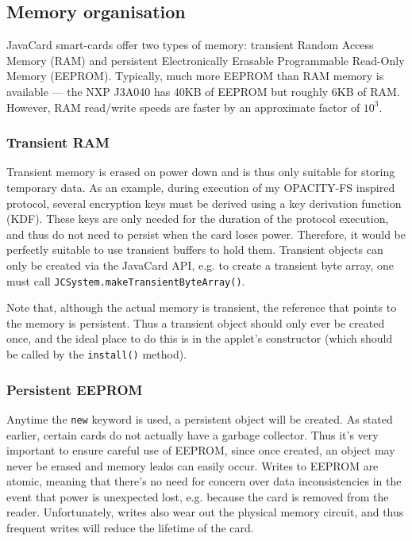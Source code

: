 \documentclass[12pt,a4paper,twoside,openright]{report}
\begin{document}
\subsection{Memory organisation} \label{javacardmemory}

JavaCard smart-cards offer two types of memory: transient Random Access Memory (RAM) and persistent Electronically Erasable Programmable Read-Only Memory (EEPROM). Typically, much more EEPROM than RAM memory is available --- the NXP J3A040 has 40KB of EEPROM but roughly 6KB of RAM. However, RAM read/write speeds are faster by an approximate factor of $10^3$.

\subsubsection{Transient RAM}

Transient memory is erased on power down and is thus only suitable for storing temporary data. As an example, during execution of my OPACITY-FS inspired protocol, several encryption keys must be derived using a key derivation function (KDF). These keys are only needed for the duration of the protocol execution, and thus do not need to persist when the card loses power. Therefore, it would be perfectly suitable to use transient buffers to hold them. Transient objects can only be created via the JavaCard API, e.g. to create a transient byte array, one must call \texttt{JCSystem.makeTransientByteArray()}.

Note that, although the actual memory is transient, the reference that points to the memory is persistent. Thus a transient object should only ever be created once, and the ideal place to do this is in the applet's constructor (which should be called by the \texttt{install()} method).

\subsubsection{Persistent EEPROM}

Anytime the \texttt{new} keyword is used, a persistent object will be created. As stated earlier, certain cards do not actually have a garbage collector. Thus it's very important to ensure careful use of EEPROM, since once created, an object may never be erased and memory leaks can easily occur. Writes to EEPROM are atomic, meaning that there's no need for concern over data inconsistencies in the event that power is unexpected lost, e.g. because the card is removed from the reader. Unfortunately, writes also wear out the physical memory circuit, and thus frequent writes will reduce the lifetime of the card.
\end{document}
